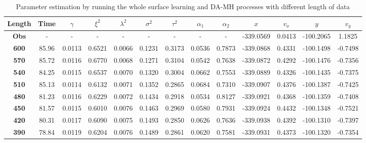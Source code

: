 \begin{landscape}
\begin{table}[h]
\centering
\caption{Parameter estimation by running the whole surface learning and DA-MH processes with different length of data}
\begin{tabular}{|c|c|c|c|c|c|c|c|c|c|c|c|c|}
\hline
\textbf{Length} & \textbf{Time} & $\gamma$ & $\xi^2$ & $\lambda^2$ & $\sigma^2$ & $\tau^2$ & $\alpha_1$ & $\alpha_2$ &$x$ & $v_x$ &$y$&$v_y$\\ \hline
\textbf{Obs}    & -             & -              & -            & -              & -               & -             & -           & -           & -339.0569  & 0.0413      & -100.2065  & 1.1825      \\ \hline
\textbf{600}    & 85.96         & 0.0113         & 0.6521       & 0.0066         & 0.1231          & 0.3173        & 0.0536      & 0.7873      & -339.0868  & 0.4331      & -100.1498  & -0.7498     \\ \hline
\textbf{570}    & 85.72         & 0.0116         & 0.6770       & 0.0068         & 0.1271          & 0.3104        & 0.0542      & 0.7638      & -339.0872  & 0.4292      & -100.1476  & -0.7356     \\ \hline
\textbf{540}    & 84.25         & 0.0115         & 0.6537       & 0.0070         & 0.1320          & 0.3004        & 0.0662      & 0.7553      & -339.0889  & 0.4326      & -100.1435  & -0.7375     \\ \hline
\textbf{510}    & 85.13         & 0.0114         & 0.6132       & 0.0071         & 0.1352          & 0.2865        & 0.0684      & 0.7310      & -339.0907  & 0.4376      & -100.1387  & -0.7425     \\ \hline
\textbf{480}    & 81.23         & 0.0116         & 0.6229       & 0.0072         & 0.1434          & 0.2918        & 0.0534      & 0.8127      & -339.0921  & 0.4368      & -100.1359  & -0.7408     \\ \hline
\textbf{450}    & 81.57         & 0.0115         & 0.6010       & 0.0076         & 0.1463          & 0.2969        & 0.0580      & 0.7931      & -339.0924  & 0.4432      & -100.1348  & -0.7521     \\ \hline
\textbf{420}    & 80.31         & 0.0117         & 0.6090       & 0.0075         & 0.1493          & 0.2850        & 0.0626      & 0.7636      & -339.0938  & 0.4392      & -100.1310  & -0.7397     \\ \hline
\textbf{390}    & 78.84         & 0.0119         & 0.6204       & 0.0076         & 0.1489          & 0.2861        & 0.0620      & 0.7581      & -339.0931  & 0.4373      & -100.1320  & -0.7354     \\ \hline

\end{tabular}
\end{table}
\end{landscape}
